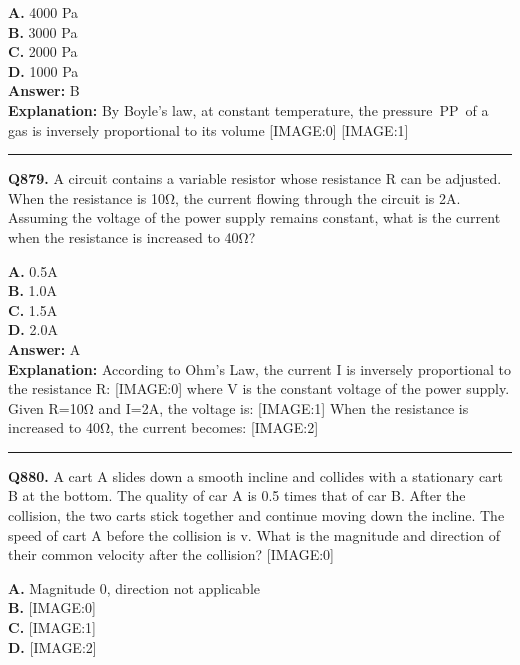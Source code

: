 \documentclass[12pt]{article}
\begin{document}
\textbf{A.} 4000 Pa \\
\textbf{B.} 3000 Pa \\
\textbf{C.} 2000 Pa \\
\textbf{D.} 1000 Pa \\

\textbf{Answer:} B \\
\textbf{Explanation:} By Boyle’s law, at constant temperature, the pressure PP of a gas is inversely proportional to its volume
[IMAGE:0]
[IMAGE:1]

\hrule
\vspace{1em}


\noindent
\textbf{Q879.} A circuit contains a variable resistor whose resistance R can be adjusted. When the resistance is 10Ω, the current flowing through the circuit is 2A. Assuming the voltage of the power supply remains constant, what is the current when the resistance is increased to 40Ω?



\textbf{A.} 0.5A \\
\textbf{B.} 1.0A \\
\textbf{C.} 1.5A \\
\textbf{D.} 2.0A \\

\textbf{Answer:} A \\
\textbf{Explanation:} According to Ohm's Law, the current I is inversely proportional to the resistance R:
[IMAGE:0]
where V is the constant voltage of the power supply. Given R=10Ω and I=2A, the voltage is:
[IMAGE:1]
When the resistance is increased to 40Ω, the current becomes:
[IMAGE:2]

\hrule
\vspace{1em}


\noindent
\textbf{Q880.} A cart A slides down a smooth incline and collides with a stationary cart B at the bottom.
The quality of car A is 0.5 times that of car B.
After the collision, the two carts stick together and continue moving down the incline. The speed of cart A before the collision is v. What is the magnitude and direction of their common velocity after the collision?
[IMAGE:0]



\textbf{A.} Magnitude 0, direction not applicable \\
\textbf{B.} [IMAGE:0] \\
\textbf{C.} [IMAGE:1] \\
\textbf{D.} [IMAGE:2] \\
\end{document}
